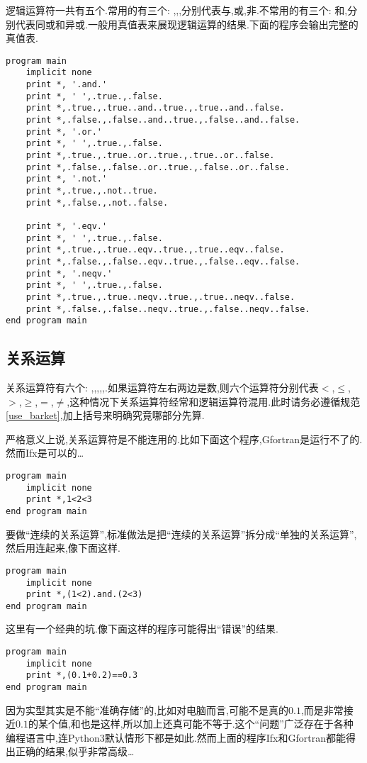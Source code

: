 逻辑运算符一共有五个.常用的有三个: ,,,分别代表与,或,非.不常用的有三个: 和,分别代表同或和异或.一般用真值表来展现逻辑运算的结果.下面的程序会输出完整的真值表.
\begin{lstlisting}
program main
    implicit none
    print *, '.and.'
    print *, ' ',.true.,.false.
    print *,.true.,.true..and..true.,.true..and..false.
    print *,.false.,.false..and..true.,.false..and..false.
    print *, '.or.'
    print *, ' ',.true.,.false.
    print *,.true.,.true..or..true.,.true..or..false.
    print *,.false.,.false..or..true.,.false..or..false.
    print *, '.not.'
    print *,.true.,.not..true.
    print *,.false.,.not..false.
  
    print *, '.eqv.'
    print *, ' ',.true.,.false.
    print *,.true.,.true..eqv..true.,.true..eqv..false.
    print *,.false.,.false..eqv..true.,.false..eqv..false.
    print *, '.neqv.'
    print *, ' ',.true.,.false.
    print *,.true.,.true..neqv..true.,.true..neqv..false.
    print *,.false.,.false..neqv..true.,.false..neqv..false.
end program main
\end{lstlisting}

\subsection{关系运算}

关系运算符有六个: \ttt{<},\ttt{<=},\ttt{>},\ttt{>=},\ttt{==},\ttt{/=}.如果运算符左右两边是数,则六个运算符分别代表$<$,$\leqslant$,$>$,$\geqslant$,$=$,$\ne$,这种情况下关系运算符经常和逻辑运算符混用.此时请务必遵循规范\ref{use_barket},加上括号来明确究竟哪部分先算.

严格意义上说,关系运算符是不能连用的.比如下面这个程序,Gfortran是运行不了的.然而Ifx是可以的\dots
\begin{lstlisting}
program main
    implicit none
    print *,1<2<3
end program main
\end{lstlisting}

要做``连续的关系运算'',标准做法是把``连续的关系运算''拆分成``单独的关系运算'',然后用连起来,像下面这样.
\begin{lstlisting}
program main
    implicit none
    print *,(1<2).and.(2<3)
end program main
\end{lstlisting}

这里有一个经典的坑.像下面这样的程序可能得出``错误''的结果.
\begin{lstlisting}
program main
    implicit none
    print *,(0.1+0.2)==0.3
end program main
\end{lstlisting}
因为实型其实是不能``准确存储''的,比如对电脑而言,可能不是真的$0.1$,而是非常接近$0.1$的某个值,和也是这样,所以加上还真可能不等于.这个``问题''广泛存在于各种编程语言中,连Python3默认情形下都是如此.然而上面的程序Ifx和Gfortran都能得出正确的结果,似乎非常高级\dots

